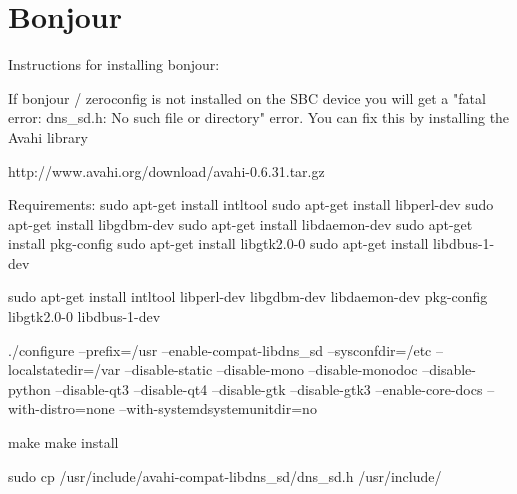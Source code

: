 \section{Bonjour}

Instructions for installing bonjour:

If bonjour / zeroconfig is not installed on the SBC device you will get a "fatal error: dns\_sd.h: No such file or directory" error. You can fix this by installing the Avahi library

http://www.avahi.org/download/avahi-0.6.31.tar.gz

Requirements:
sudo apt-get install intltool
sudo apt-get install libperl-dev
sudo apt-get install libgdbm-dev
sudo apt-get install libdaemon-dev
sudo apt-get install pkg-config
sudo apt-get install libgtk2.0-0
sudo apt-get install libdbus-1-dev

sudo apt-get install intltool libperl-dev libgdbm-dev libdaemon-dev pkg-config libgtk2.0-0 libdbus-1-dev


./configure --prefix=/usr  --enable-compat-libdns\_sd  --sysconfdir=/etc  --localstatedir=/var  --disable-static  --disable-mono  --disable-monodoc  --disable-python  --disable-qt3  --disable-qt4   --disable-gtk  --disable-gtk3  --enable-core-docs  --with-distro=none --with-systemdsystemunitdir=no




make
make install

sudo cp /usr/include/avahi-compat-libdns_sd/dns_sd.h /usr/include/